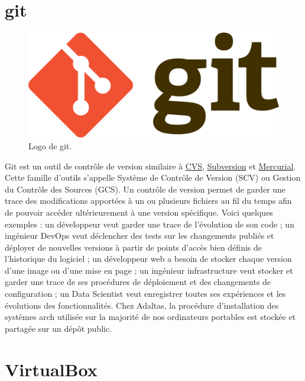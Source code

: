 \documentclass[12pt, french]{report}
\begin{document}
\section{git}

\begin{figure}[H]
\includegraphics[scale=0.1]{assets/img/logo-git.png}
\centering
\caption{Logo de git.}
\label{fig:logo-adaltas}
\end{figure}

Git est un outil de contrôle de version similaire à \href{https://en.wikipedia.org/wiki/Concurrent_Versions_System}{CVS}, \href{https://subversion.apache.org/}{Subversion} et \href{https://www.mercurial-scm.org/}{Mercurial}. Cette famille d'outils s'appelle Système de Contrôle de Version (SCV) ou Gestion du Contrôle des Sources (GCS). Un contrôle de version permet de garder une trace des modifications apportées à un ou plusieurs fichiers au fil du temps afin de pouvoir accéder ultérieurement à une version spécifique. Voici quelques exemples : un développeur veut garder une trace de l'évolution de son code ; un ingénieur DevOps veut déclencher des tests sur les changements publiés et déployer de nouvelles versions à partir de points d'accès bien définis de l'historique du logiciel ; un développeur web a besoin de stocker chaque version d'une image ou d'une mise en page ; un ingénieur infrastructure veut stocker et garder une trace de ses procédures de déploiement et des changements de configuration ; un Data Scientist veut enregistrer toutes ses expériences et les évolutions des fonctionnalités. Chez Adaltas, la procédure d'installation des systèmes \gls{arch} utilisée sur la majorité de nos ordinateurs portables est stockée et partagée sur un dépôt public.

\section{VirtualBox}
\end{document}
